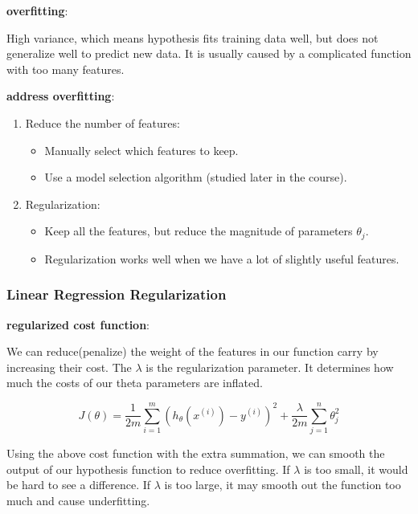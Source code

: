 \documentclass{article}
\begin{document}
\bigskip

\noindent \textbf{overfitting}:

\noindent High variance, which means hypothesis fits training data well, but does not generalize well to predict new data. It is usually caused by a complicated function with too many features.

\bigskip

\noindent \textbf{address overfitting}:

\begin{enumerate}
\item Reduce the number of features:
\begin{itemize}
\item Manually select which features to keep.
\item Use a model selection algorithm (studied later in the course).
\end{itemize}
\item Regularization:
\begin{itemize}
\item Keep all the features, but reduce the magnitude of parameters \(\theta_j\).
\item Regularization works well when we have a lot of slightly useful features.
\end{itemize}
\end{enumerate}

\subsubsection{Linear Regression Regularization}

\noindent \textbf{regularized cost function}:

\noindent We can reduce(penalize) the weight of the features in our function carry by increasing their cost. The \(\lambda\) is the regularization parameter. It determines how much the costs of our theta parameters are inflated. 

\[J(\theta) = \frac{1}{2m} \sum_{i = 1}^m (h_{\theta}(x^{(i)}) - y^{(i)})^2 + \frac{\lambda}{2m} \sum_{j = 1}^n \theta_j^2\]

\noindent Using the above cost function with the extra summation, we can smooth the output of our hypothesis function to reduce overfitting. If \(\lambda\) is too small, it would be hard to see a difference. If \(\lambda\) is too large, it may smooth out the function too much and cause underfitting.

\bigskip
\end{document}
